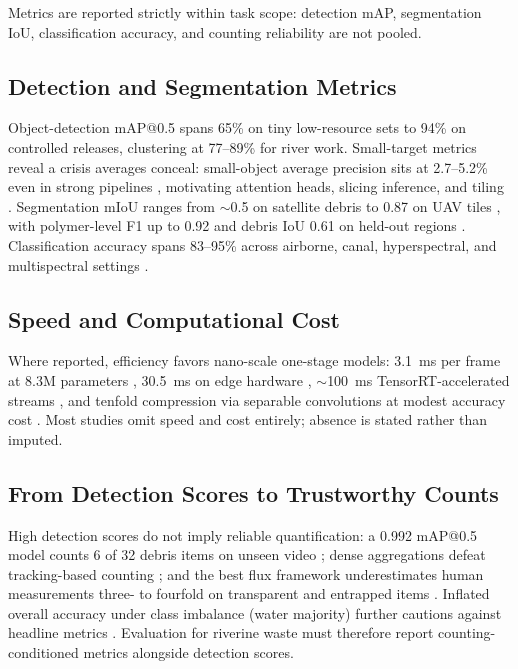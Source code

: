 \documentclass[12pt]{article}
\begin{document}
Metrics are reported strictly within task scope: detection mAP, segmentation IoU, classification accuracy, and counting reliability are not pooled.

\subsection{Detection and Segmentation Metrics}
Object-detection mAP@0.5 spans 65\% on tiny low-resource sets to 94\% on controlled releases, clustering at 77--89\% for river work. Small-target metrics reveal a crisis averages conceal: small-object average precision sits at 2.7--5.2\% even in strong pipelines \cite{Tharani2021}, motivating attention heads, slicing inference, and tiling \cite{Lin2021,JiaFlux2025,FrontEnv2025}. Segmentation mIoU ranges from $\sim$0.5 on satellite debris to 0.87 on UAV tiles \cite{SoleGomez2022,Pati2025}, with polymer-level F1 up to 0.92 \cite{Jakovljevic2020} and debris IoU 0.61 on held-out regions \cite{SoleGomez2022}. Classification accuracy spans 83--95\% across airborne, canal, hyperspectral, and multispectral settings \cite{Wolf2020,JiaFrontiers2023,Tasseron2022,Cortesi2022}.

\subsection{Speed and Computational Cost}
Where reported, efficiency favors nano-scale one-stage models: 3.1~ms per frame at 8.3M parameters \cite{Liu2025}, 30.5~ms on edge hardware \cite{Yan2025}, $\sim$100~ms TensorRT-accelerated streams \cite{FrontEnv2025}, and tenfold compression via separable convolutions at modest accuracy cost \cite{Tharani2021}. Most studies omit speed and cost entirely; absence is stated rather than imputed.

\subsection{From Detection Scores to Trustworthy Counts}
High detection scores do not imply reliable quantification: a 0.992 mAP@0.5 model counts 6 of 32 debris items on unseen video \cite{Lee2025}; dense aggregations defeat tracking-based counting \cite{FrontEnv2025}; and the best flux framework underestimates human measurements three- to fourfold on transparent and entrapped items \cite{JiaFlux2025}. Inflated overall accuracy under class imbalance (water majority) further cautions against headline metrics \cite{Mohsen2023}. Evaluation for riverine waste must therefore report counting-conditioned metrics alongside detection scores.
\end{document}

